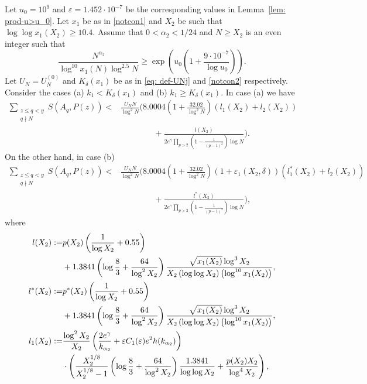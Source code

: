 \documentclass[12pt]{amsart}
\begin{document}
\begin{theorem}
\label{theo:2.}
Let $u_0=10^9$ and $\varepsilon=1.452\cdot 10^{-7}$ be the corresponding values in Lemma~\ref{lem: prod-u>u_0}. Let $x_1$ be as in \eqref{notcon1} and $X_2$ be such that $\log\log x_1(X_2)\ge 10.4$. Assume that $0<\alpha_2 <1/24$ and $N\ge X_2$ is an even integer such that
\begin{equation*}
\frac{N^{\alpha_2}}{\log^{10} x_1(N) \log^{2.5} N}\ge \exp \left(u_0\left(1+\frac{9\cdot 10^{-7}}{\log u_0} \right)\right).
\end{equation*}
Let $U_N = U_N^{(0)}$ and $K_{\delta}(x_1)$ be as in \eqref{eq: def-UNj} and \eqref{notcon2} respectively. Consider the cases (a) $k_1<K_{\delta}(x_1)$ and (b) $k_1\ge K_{\delta}(x_1)$. In case (a) we have
\begin{align*}
\sum_{\substack{z \le q < y\\ q\nmid N}} S(A_q,P(z)) <& \frac{U_N N}{\log^2N}\Bigg(8.0004\left( 1+\frac{32.02}{\log^2 N}\right)(l_1(X_2)+l_2(X_2))\\&\qquad\qquad+\frac{l(X_2)}{2 e^{\gamma}\prod_{p>2}\left( 1-\frac{1}{(p-1)^2}\right) \log N} \Bigg).
\end{align*}
On the other hand, in case (b)
\begin{align*}
\sum_{\substack{z \le q < y\\q\nmid N}} S(A_q,P(z)) <& \frac{U_N N}{\log^2N}\Bigg(8.0004\left( 1+\frac{32.02}{\log^2 N}\right)\left(1+\varepsilon_1(X_2,\delta)\right)(l_1^*(X_2)+l_2(X_2))\\&\qquad\qquad+\frac{l^*(X_2)}{2 e^{\gamma}\prod_{p>2}\left( 1-\frac{1}{(p-1)^2}\right) \log N} \Bigg),
\end{align*}
where
\begin{align}
l(X_2):=&p(X_2)\left(\frac{1}{\log X_2}+0.55 \right)\notag\\&+ 1.3841\left(\log \frac{8}{3}+\frac{64}{\log^2 X_2} \right)\frac{ \sqrt{x_1(X_2)}\log^3 X_2}{X_2 \left(\log \log X_2\right)\left( \log^{10} x_1(X_2)\right)},\label{elleq}\\
l^*(X_2):=&p^*(X_2)\left(\frac{1}{\log X_2}+0.55 \right)\notag\\&+ 1.3841\left(\log \frac{8}{3}+\frac{64}{\log^2 X_2} \right)\frac{ \sqrt{x_1(X_2)}\log^3 X_2}{X_2 \left(\log \log X_2\right)\left( \log^{10} x_1(X_2)\right)},\label{ellstareq}\\
l_1(X_2):=&\frac{\log^2 X_2}{X_2}  \left(\frac{ 2e^{\gamma}}{k_{\alpha_2}}
+\varepsilon C_1(\varepsilon) e^2 h(k_{\alpha_2})\right) \notag\\ & \cdot \left(\frac{X_2^{1/8}}{X_2^{1/8}-1}\left(\log \frac{8}{3}+\frac{64}{\log^2X_2}\right)\frac{1.3841}{\log \log X_2} +\frac{p(X_2)X_2}{\log^4X_2}\right),\label{ell1eq}\\

\end{align}
\end{theorem}
\end{document}
